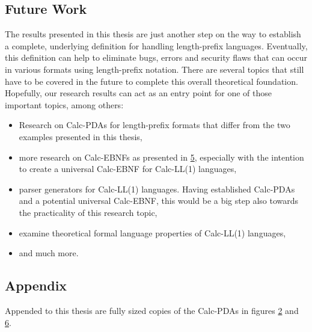 \subsection{Future Work}
\label{6.2}
The results presented in this thesis are just another step on the way to establish a complete, underlying definition for handling length-prefix languages. Eventually, this definition can help to eliminate bugs, errors and security flaws that can occur in various formats using length-prefix notation. There are several topics that still have to be covered in the future to complete this overall theoretical foundation. Hopefully, our research results can act as an entry point for one of those important topics, among others:
\begin{itemize}
    \item Research on Calc-PDAs for length-prefix formats that differ from the two examples presented in this thesis,
    \item more research on Calc-EBNFs as presented in \hyperref[5.0]{5}, especially with the intention to create a universal Calc-EBNF for Calc-LL(1) languages,
    \item parser generators for Calc-LL(1) languages. Having established Calc-PDAs and a potential universal Calc-EBNF, this would be a big step also towards the practicality of this research topic,
    \item examine theoretical formal language properties of Calc-LL(1) languages,
    \item and much more.
\end{itemize}

\subsection{Appendix}
\label{6.3}
Appended to this thesis are fully sized copies of the Calc-PDAs in figures \hyperref[fig:fig-2-netstring-Calc-pda-1]{2} and \hyperref[fig:fig-6-protobuf-Calc-pda-1]{6}.

